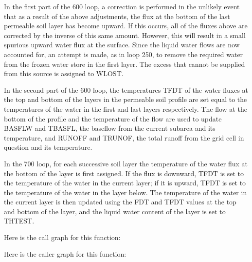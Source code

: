 In the first part of the 600 loop, a correction is performed in the unlikely event that as a result of the above adjustments, the flux at the bottom of the last permeable soil layer has become upward. If this occurs, all of the fluxes above are corrected by the inverse of this same amount. However, this will result in a small spurious upward water flux at the surface. Since the liquid water flows are now accounted for, an attempt is made, as in loop 250, to remove the required water from the frozen water store in the first layer. The excess that cannot be supplied from this source is assigned to W\+L\+O\+S\+T.

In the second part of the 600 loop, the temperatures T\+F\+D\+T of the water fluxes at the top and bottom of the layers in the permeable soil profile are set equal to the temperatures of the water in the first and last layers respectively. The flow at the bottom of the profile and the temperature of the flow are used to update B\+A\+S\+F\+L\+W and T\+B\+A\+S\+F\+L, the baseflow from the current subarea and its temperature, and R\+U\+N\+O\+F\+F and T\+R\+U\+N\+O\+F, the total runoff from the grid cell in question and its temperature.

In the 700 loop, for each successive soil layer the temperature of the water flux at the bottom of the layer is first assigned. If the flux is downward, T\+F\+D\+T is set to the temperature of the water in the current layer; if it is upward, T\+F\+D\+T is set to the temperature of the water in the layer below. The temperature of the water in the current layer is then updated using the F\+D\+T and T\+F\+D\+T values at the top and bottom of the layer, and the liquid water content of the layer is set to T\+H\+T\+E\+S\+T.

Here is the call graph for this function\+:




Here is the caller graph for this function\+:


